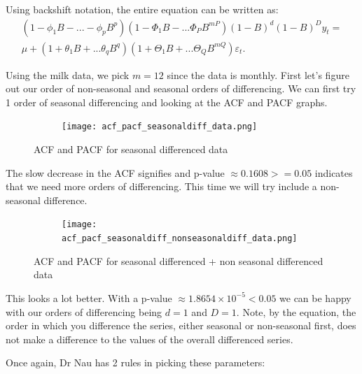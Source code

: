 \documentclass{article}
\begin{document}
  Using backshift notation, the entire equation can be written as:
  \begin{equation*}
    \begin{split}
      (1 - \phi_1B - ... - \phi_pB^p)(1 - \Phi_1B - ... \Phi_PB^{mP})(1 - B)^d(1 - B)^D y_t = \\
      \mu + (1 + \theta_1B + ... \theta_qB^q)(1 + \Theta_1B + ... \Theta_QB^{mQ})\varepsilon_t.
    \end{split}
  \end{equation*}

  Using the milk data, we pick $m = 12$ since the data is monthly.
  First let's figure out our order of non-seasonal and seasonal orders of differencing. We can first try 1 order of seasonal differencing and looking at the ACF and PACF graphs.
  \begin{figure}[H]
    \centering
    \captionsetup{justification=centering}
    \begin{subfigure}[b]{\linewidth}
      \texttt{[image: acf\_pacf\_seasonaldiff\_data.png]}
    \end{subfigure}
    \caption{ACF and PACF for seasonal differenced data}
  \end{figure}

  The slow decrease in the ACF signifies and p-value $\approx 0.1608 >=0.05$ indicates that we need more orders of differencing. This time we will try include a non-seasonal difference.
  \begin{figure}[H]
    \centering
    \captionsetup{justification=centering}
    \begin{subfigure}[b]{\linewidth}
      \texttt{[image: acf\_pacf\_seasonaldiff\_nonseasonaldiff\_data.png]}
    \end{subfigure}
    \caption{ACF and PACF for seasonal differenced + non seasonal differenced data}
  \end{figure}

  This looks a lot better. With a p-value $\approx 1.8654\times10^{-5}<0.05$ we can be happy with our orders of differencing being $d=1$ and $D=1$. Note, by the equation, the order in which you difference the series, either seasonal or non-seasonal first, does not make a difference to the values of the overall differenced series.
  
  Once again, Dr Nau has 2 rules in picking these parameters:
  \newline
  \emph{\\
  }
\end{document}

